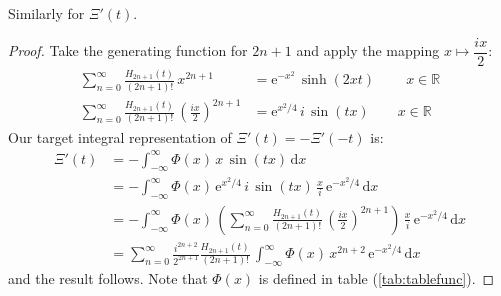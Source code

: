 \documentclass[a4paper,11pt,twoside]{amsart}
\newcommand{\verifiedeq}{=}
\newcommand{\verifiedeq}{\stackrel{\checkmark}{=}}
\begin{document}
Similarly for $\Xi'(t)$. 
\begin{proof}
Take the generating function for $2n+1$ and apply the mapping $x \mapsto \dfrac{ix}{2}$:
\begin{align}
 \sum_{n=0}^\infty \frac{H_{2n+1}(t)}{(2n+1)!}\, x^{2n+1} &\verifiedeq \mathrm{e}^{-x^2}\,\sinh(2xt) \ \qquad x \in \mathbb{R} \\
 \sum_{n=0}^\infty \frac{H_{2n+1}(t)}{(2n+1)!}\,\left(\frac{ix}{2}\right)^{2n+1} &\verifiedeq  \mathrm{e}^{x^2/4}\,i\,\sin(tx)\qquad x \in \mathbb{R}
\end{align}
Our target integral representation of $\Xi'(t) = -\Xi'(-t)$ is:
\begin{align}
 \Xi'(t) &\verifiedeq -\int_{-\infty}^\infty \Phi(x)\,x\,\sin(tx)\, \mathrm{d}x \\
  & \verifiedeq -\int_{-\infty}^\infty \Phi(x)\,\mathrm{e}^{x^2/4}\,i\,\sin(tx)\,\frac{x}{i}\,\mathrm{e}^{-x^2/4}\,\mathrm{d}x \\
  & \verifiedeq -\int_{-\infty}^\infty \Phi(x)\,\left(\sum_{n=0}^\infty \frac{H_{2n+1}(t)}{(2n+1)!}\,\left(\frac{ix}{2}\right)^{2n+1} \right)\,\frac{x}{i}\,\mathrm{e}^{-x^2/4}\,\mathrm{d}x \\
  & \verifiedeq \sum_{n=0}^\infty \frac{i^{2n+2}}{2^{2n+1}}\frac{H_{2n+1}(t)}{(2n+1)!}\,\int_{-\infty}^\infty \Phi(x)\,x^{2n+2}\,\mathrm{e}^{-x^2/4}\,\mathrm{d}x
\end{align}
and the result follows. Note that $\Phi(x)$ is defined in table (\ref{tab:tablefunc}).
\end{proof}
\end{document}
